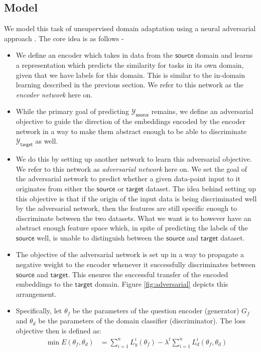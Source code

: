 \documentclass{sigkddExp}
\begin{document}
\subsection{Model}
We model this task of unsupervised domain adaptation using a neural adversarial approach \cite{ganin2015unsupervised}. The core idea is as follows - 
\begin{itemize}[topsep=0pt,itemsep=-1ex,partopsep=1ex,parsep=1ex]
    \item We define an encoder which takes in data from the $\mathsf{source}$ domain and learns a representation which predicts the similarity for tasks in its own domain, given that we have labels for this domain. This is similar to the in-domain learning described in the previous section. We refer to this network as the \textit{encoder network} here on.
    \item While the primary goal of predicting $\mathcal{Y}_\mathsf{source}$ remains, we define an adversarial objective to guide the direction of the embeddings encoded by the encoder network in a way to make them abstract enough to be able to discriminate $\mathcal{Y}_\mathsf{target}$ as well.
    
    \item We do this by setting up another network to learn this adversarial objective. We refer to this network as \textit{adversarial network} here on. We set the goal of the adversarial network to predict whether a given data-point input to it originates from either the $\mathsf{source}$ or $\mathsf{target}$ dataset. The idea behind setting up this objective is that if the origin of the input data is being discriminated well by the adversarial network, then the features are still specific enough to discriminate between the two datasets. What we want is to however have an abstract enough feature space which, in spite of predicting the labels of the $\mathsf{source}$ well, is unable to distinguish between the $\mathsf{source}$ and $\mathsf{target}$ dataset.
    \item The objective of the adversarial network is set up in a way to propagate a negative weight to the encoder whenever it successfully discriminates between $\mathsf{source}$ and $\mathsf{target}$. This ensures the successful transfer of the encoded embeddings to the $\mathsf{target}$ domain. Figure \ref{fig:adversarial} depicts this arrangement.
    
    \item  Specifically, let $\theta_f$ be the parameters of the question encoder (generator) $G_f$ and $\theta_d$ be the parameters of the domain classifier (discriminator). The loss objective then is defined as:
    \begin{equation}
    \left.\begin{aligned}
     \min E(\theta_f, \theta_d) &= \sum_{i=1}^{n}L_{y}^{i}(\theta_f) - \lambda^{t}\sum_{i=1}^{n}L_{d}^{i}(\theta_f, \theta_d)
     \\
     \end{aligned}\right.
     \end{equation}
     

\end{itemize}
\end{document}
